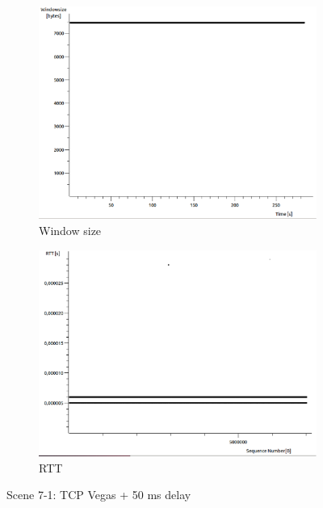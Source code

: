 \documentclass[conference,a4paper]{IEEEtran}
\begin{document}
\begin{figure}
\begin{subfigure}[b]{0.2\textwidth}
  \includegraphics[width=\textwidth]{s7-1_wsize}
  \caption{Window size}
 \end{subfigure}
 \begin{subfigure}[b]{0.2\textwidth}
  \includegraphics[width=\textwidth]{s7-1_rtt}
  \caption{RTT}
 \end{subfigure}
 \caption{Scene 7-1: TCP Vegas + 50 ms delay}
\end{figure}
\end{document}
